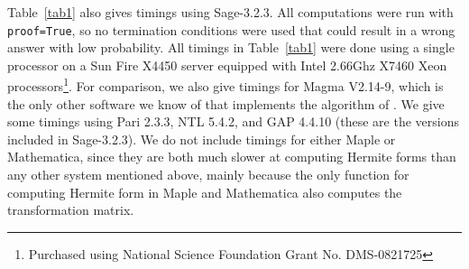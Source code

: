 \documentclass[preprint,12pt]{elsarticle}
\theoremstyle{plain}
\theoremstyle{definition}
\numberwithin{equation}{section}
\numberwithin{figure}{section}
\numberwithin{table}{section}
\begin{document}
Table~\ref{tab1} also gives timings using Sage-3.2.3.  All
computations were run with {\tt proof=True}, so no termination
conditions were used that could result in a wrong answer with low
probability.  All timings in Table~\ref{tab1} were done using a single
processor on a Sun Fire X4450 server equipped with Intel 2.66Ghz X7460
Xeon processors\footnote{Purchased using National Science Foundation
  Grant No. DMS-0821725}.  For comparison, we also give timings for
Magma \cite{magma} V2.14-9, which is the only other software we know
of that implements the algorithm of \cite{MicWar01}.  We give some
timings using Pari \cite{pari} 2.3.3, NTL 5.4.2, and GAP 4.4.10 (these
are the versions included in Sage-3.2.3).  We do not include timings
for either Maple or Mathematica, since they are both much slower at
computing Hermite forms than any other system mentioned above, mainly
because the only function for computing Hermite form in Maple and
Mathematica also computes the transformation matrix.
\end{document}
